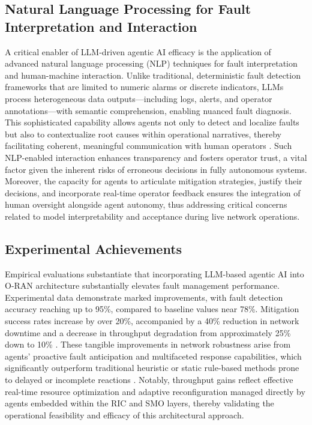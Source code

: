 \documentclass[sigconf]{acmart}
\begin{document}
\subsection{Natural Language Processing for Fault Interpretation and Interaction}

A critical enabler of LLM-driven agentic AI efficacy is the application of advanced natural language processing (NLP) techniques for fault interpretation and human-machine interaction. Unlike traditional, deterministic fault detection frameworks that are limited to numeric alarms or discrete indicators, LLMs process heterogeneous data outputs---including logs, alerts, and operator annotations---with semantic comprehension, enabling nuanced fault diagnosis. This sophisticated capability allows agents not only to detect and localize faults but also to contextualize root causes within operational narratives, thereby facilitating coherent, meaningful communication with human operators \cite{ref55}. Such NLP-enabled interaction enhances transparency and fosters operator trust, a vital factor given the inherent risks of erroneous decisions in fully autonomous systems. Moreover, the capacity for agents to articulate mitigation strategies, justify their decisions, and incorporate real-time operator feedback ensures the integration of human oversight alongside agent autonomy, thus addressing critical concerns related to model interpretability and acceptance during live network operations.

\subsection{Experimental Achievements}

Empirical evaluations substantiate that incorporating LLM-based agentic AI into O-RAN architecture substantially elevates fault management performance. Experimental data demonstrate marked improvements, with fault detection accuracy reaching up to 95\%, compared to baseline values near 78\%. Mitigation success rates increase by over 20\%, accompanied by a 40\% reduction in network downtime and a decrease in throughput degradation from approximately 25\% down to 10\% \cite{ref46,ref55,ref27}. These tangible improvements in network robustness arise from agents' proactive fault anticipation and multifaceted response capabilities, which significantly outperform traditional heuristic or static rule-based methods prone to delayed or incomplete reactions \cite{ref27}. Notably, throughput gains reflect effective real-time resource optimization and adaptive reconfiguration managed directly by agents embedded within the RIC and SMO layers, thereby validating the operational feasibility and efficacy of this architectural approach.
\end{document}
